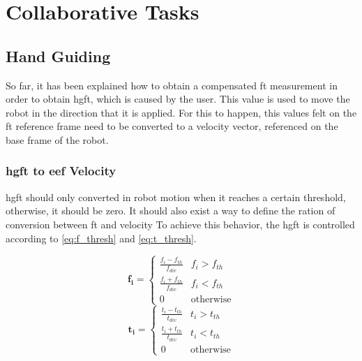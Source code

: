 \chapter{Collaborative Tasks}
\label{chapter:colab-tasks}






\section{Hand Guiding}

\par So far, it has been explained how to obtain a compensated \ac{ft} measurement in order to obtain \acf{hgft}, which is caused by the user. This value is used to move the robot in the direction that it is applied. For this to happen, this values felt on the \ac{ft} reference frame need to be converted to a velocity vector, referenced on the base frame of the robot. 



\subsection{\ac{hgft} to \ac{eef} Velocity}
\label{ssec:ft_to_eef}

\par \ac{hgft} should only converted in robot motion when it reaches a certain threshold, otherwise, it should be zero. It should also exist a way to define the ration of conversion between \ac{ft} and velocity To achieve this behavior, the \ac{hgft} is controlled according to \autoref{eq:f_thresh} and \autoref{eq:t_thresh}.

\begin{multicols}{2}
    \begin{equation}
        \mathbf{f_i} =
        \begin{cases}
          \frac{f_i - f_{th}}{f_{div}} & f_i > f_{th}\\
          \frac{f_i + f_{th}}{f_{div}} & f_i < f_{th}\\
          0 & \text{otherwise}
        \end{cases}
        \label{eq:f_thresh}
    \end{equation}\break
    \begin{equation}
        \mathbf{t_i} =
        \begin{cases}
          \frac{t_i - t_{th}}{t_{div}} & t_i > t_{th}\\
          \frac{t_i + t_{th}}{t_{div}} & t_i < t_{th}\\
          0 & \text{otherwise}
        \end{cases}
        \label{eq:t_thresh} 
    \end{equation}
\end{multicols}

